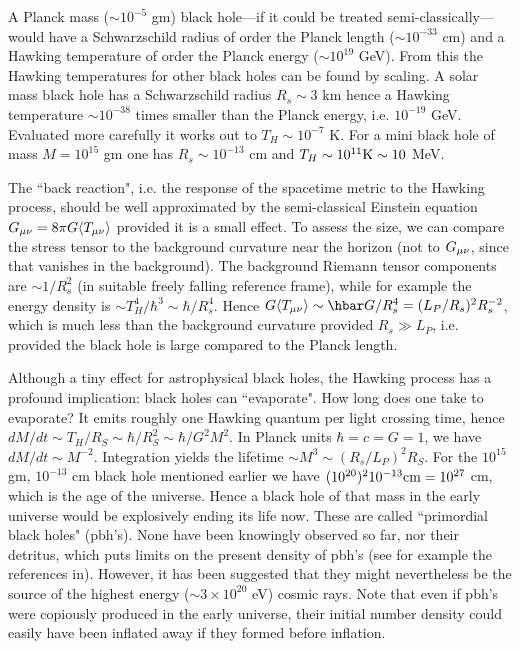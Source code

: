 \documentclass[12pt]{article}
\begin{document}
A Planck mass ($\sim 10^{-5}$ gm) black 
hole---if it could be treated semi-classically---would have a Schwarzschild
radius of order the Planck length ($\sim 10^{-33}$ cm)
and a Hawking temperature of order the Planck energy ($\sim 10^{19}$ GeV). 
From this the Hawking temperatures for other black holes can be found by scaling.
A solar mass black hole has a Schwarzschild radius
$R_s\sim 3$ km hence a Hawking temperature $\sim10^{-38}$ times
smaller than the Planck energy, i.e. $10^{-19}$ GeV. Evaluated more carefully
it works out to $T_H\sim 10^{-7}$ K. For
a mini black hole of mass $M=10^{15}$ gm one has 
$R_s\sim 10^{-13}$ cm and $T_H\sim 10^{11} {\rm K}\sim 10$ MeV.

The ``back reaction", i.e. the response of the spacetime
metric to the Hawking process, should be well approximated 
by the semi-classical Einstein equation
$G_{\mu\nu}=8\pi G \langle T_{\mu\nu}\rangle$ provided it is a small
effect. To assess the size, we can compare 
the stress tensor to the 
background curvature near the horizon (not
to $G_{\mu\nu}$, since that vanishes in the background). 
The background Riemann tensor components are $\sim 1/R_s^2$
(in suitable freely falling reference frame), while
for example the energy density is
$\sim T_H^4/\hbar^3\sim \hbar/R_s^4$.
Hence $G \la T_{\m\n}\ra\sim \hbar G/R_s^4=(L_P/R_s)^2 R_s^{-2}$, which is much less than the background curvature provided $R_s\gg L_P$, i.e. provided the black hole is large compared to the Planck length.

Although a tiny effect for astrophysical black holes, 
the Hawking process 
has a profound implication: black holes can ``evaporate". 
How long does one take to evaporate? 
It emits roughly one Hawking quantum per light
crossing time, hence
$dM/dt\sim
T_H/R_S\sim \hbar/R_S^2\sim \hbar/G^2M^2$. In Planck units
$\hbar=c=G=1$, we have $dM/dt\sim M^{-2}$. Integration yields the
lifetime $\sim M^3\sim (R_s/L_P)^2 R_S$. For the $10^{15}$ gm,
$10^{-13}$ cm black hole mentioned earlier we  have $(10^{20})^2 10^{-13} {\rm
cm}=10^{27}$ cm,  which is the age of the universe. Hence a black
hole of that mass in the early universe would be explosively ending its
life now. These are called ``primordial black holes" (pbh's). 
None have been knowingly 
observed so far, nor their detritus, which puts limits on the
present density of pbh's (see for example the references in\cite{Barrau:1999sk}). 
However, it has been suggested\cite{Barrau:1999sk} that they
might nevertheless be the source of the highest energy 
($\sim 3\times 10^{20}$ eV) cosmic rays. 
Note that even if pbh's were copiously
produced in the early universe, their initial number 
density could easily have been inflated away if they formed before inflation. 
\end{document}
